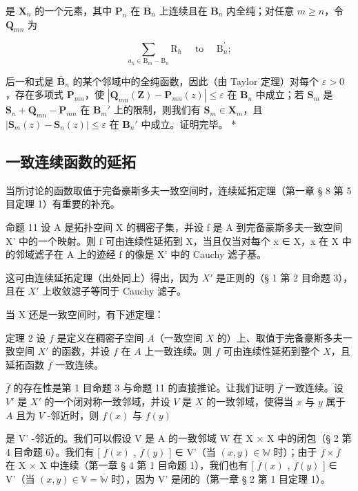 是 \(\mathbf{X}_n\) 的一个元素，其中 \(\mathbf{P}_n\) 在 \(\overline{\mathbf{B}}_n\) 上连续且在 \(\mathbf{B}_n\) 内全纯；对任意 \(m \geqslant n\)，令 \(\mathbf{Q}_{mn}\) 为

\[
\sum_ {a _ {h} \in \mathrm{B} _ {m} - \mathrm{B} _ {n}} \mathrm{R} _ {h} \quad \text { to } \quad \mathrm{B} _ {n} ^ {\prime};
\]

后一和式是 \(\bar{\mathbf{B}}_n\) 的某个邻域中的全纯函数，因此（由 Taylor 定理）对每个 \(\varepsilon > 0\)，存在多项式 \(\mathbf{P}_{mn}\)，使 \(|\mathbf{Q}_{mn}(\mathbf{Z}) - \mathbf{P}_{mn}(z)| \leqslant \varepsilon\) 在 \(\mathbf{B}_n\) 中成立；若 \(\mathbf{S}_m\) 是 \(\mathbf{S}_n + \mathbf{Q}_{mn} - \mathbf{P}_{mn}\) 在 \(\mathbf{B}_m'\) 上的限制，则我们有 \(\mathbf{S}_m \in \mathbf{X}_m\)，且 \(|\mathbf{S}_m(z) - \mathbf{S}_n(z)| \leqslant \varepsilon\) 在 \(\mathbf{B}_n'\) 中成立。证明完毕。 *

\subsection{一致连续函数的延拓}

当所讨论的函数取值于完备豪斯多夫一致空间时，连续延拓定理（第一章 § 8 第 5 目定理 1）有重要的补充。

命题 11 设 A 是拓扑空间 X 的稠密子集，并设 f 是 A 到完备豪斯多夫一致空间 X' 中的一个映射。则 f 可由连续性延拓到 X，当且仅当对每个 x ∈ X，x 在 X 中的邻域滤子在 A 上的迹经 f 的像是 X' 中的 Cauchy 滤子基。

这可由连续延拓定理（出处同上）得出，因为 \(X'\) 是正则的（§ 1 第 2 目命题 3），且在 \(X'\) 上收敛滤子等同于 Cauchy 滤子。

当 X 还是一致空间时，有下述定理：

定理 2 设 \(f\) 是定义在稠密子空间 \(A\)（一致空间 \(X\) 的）上、取值于完备豪斯多夫一致空间 \(X'\) 的函数，并设 \(f\) 在 \(A\) 上一致连续。则 \(f\) 可由连续性延拓到整个 \(X\)，且延拓函数 \(\overline{f}\) 一致连续。

\(\overline{f}\) 的存在性是第 1 目命题 3 与命题 11 的直接推论。让我们证明 \(\overline{f}\) 一致连续。设 \(V'\) 是 \(X'\) 的一个闭对称一致邻域，并设 \(V\) 是 \(X\) 的一致邻域，使得当 \(x\) 与 \(y\) 属于 \(A\) 且为 \(V\) -邻近时，则 \(f(x)\) 与 \(f(y)\)

是 V' -邻近的。我们可以假设 V 是 A 的一致邻域 W 在 X × X 中的闭包（§ 2 第 4 目命题 6）。我们有 {[} \(\overline{f}(x)\) , \(\overline{f}(y)\) {]} ∈ V'（当 \((x,y) \in \mathbb{W}\) 时）；由于 \(\overline{f} \times \overline{f}\) 在 X × X 中连续（第一章 § 4 第 1 目命题 1），我们也有 {[} \(\overline{f}(x)\) , \(\overline{f}(y)\) {]} ∈ V'（当 \((x,y) \in \mathbb{V} = \overline{\mathbb{W}}\) 时），因为 V' 是闭的（第一章 § 2 第 1 目定理 1）。

